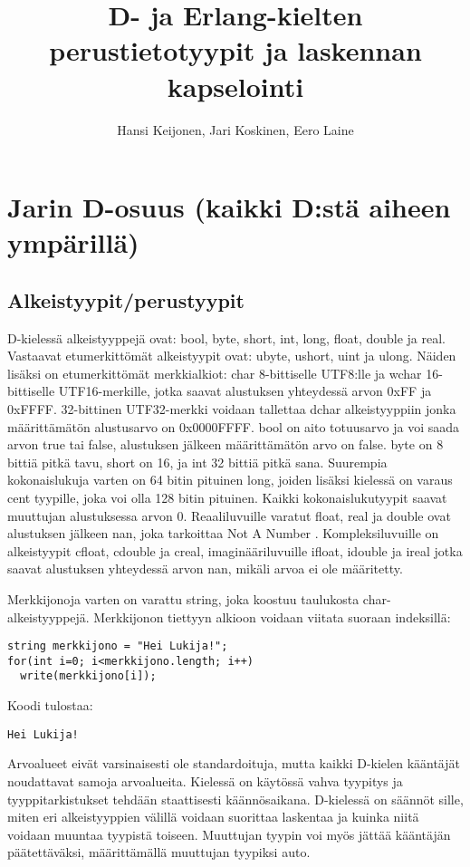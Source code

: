 \documentclass[11pt,oneside,a4paper]{article}
\title{D- ja Erlang-kielten perustietotyypit ja laskennan kapselointi}
\author{Hansi Keijonen, Jari Koskinen, Eero Laine}
\begin{document}
\maketitle

\newpage

\section{Jarin D-osuus (kaikki D:stä aiheen ympärillä)}
\subsection{Alkeistyypit/perustyypit}
D-kielessä alkeistyyppejä \cite{ALE10} ovat: bool, byte, short, int, long, float, double ja real. Vastaavat etumerkittömät alkeistyypit ovat: ubyte, ushort, uint ja ulong. Näiden lisäksi on etumerkittömät merkkialkiot: char 8-bittiselle UTF8:lle ja wchar 16-bittiselle UTF16-merkille, jotka saavat alustuksen yhteydessä arvon 0xFF ja 0xFFFF. 32-bittinen UTF32-merkki voidaan tallettaa dchar alkeistyyppiin jonka määrittämätön alustusarvo on 0x0000FFFF. bool on aito totuusarvo ja voi saada arvon true tai false, alustuksen jälkeen määrittämätön arvo on false. byte on 8 bittiä pitkä tavu, short on 16, ja int 32 bittiä pitkä sana. Suurempia kokonaislukuja varten on 64 bitin pituinen long, joiden lisäksi kielessä on varaus cent tyypille, joka voi olla 128 bitin pituinen. Kaikki kokonaislukutyypit saavat muuttujan alustuksessa arvon 0. Reaaliluvuille varatut float, real ja double ovat alustuksen jälkeen nan, joka tarkoittaa Not A Number \cite{DLA13}. Kompleksiluvuille on alkeistyypit cfloat, cdouble ja creal, imaginääriluvuille ifloat, idouble ja ireal jotka saavat alustuksen yhteydessä arvon nan, mikäli arvoa ei ole määritetty.

Merkkijonoja varten on varattu string, joka koostuu taulukosta char-alkeistyyppejä. Merkkijonon tiettyyn alkioon voidaan viitata suoraan indeksillä:

\begin{verbatim}
string merkkijono = "Hei Lukija!";
for(int i=0; i<merkkijono.length; i++)
  write(merkkijono[i]);
\end{verbatim}
Koodi tulostaa:
\begin{verbatim}
Hei Lukija!
\end{verbatim}

Arvoalueet eivät varsinaisesti ole standardoituja, mutta kaikki D-kielen kääntäjät noudattavat samoja arvoalueita. Kielessä on käytössä vahva tyypitys ja tyyppitarkistukset tehdään staattisesti käännösaikana. D-kielessä on säännöt sille, miten eri alkeistyyppien välillä voidaan suorittaa laskentaa ja kuinka niitä voidaan muuntaa tyypistä toiseen. Muuttujan tyypin voi myös jättää kääntäjän päätettäväksi, määrittämällä muuttujan tyypiksi auto.
\end{document}
